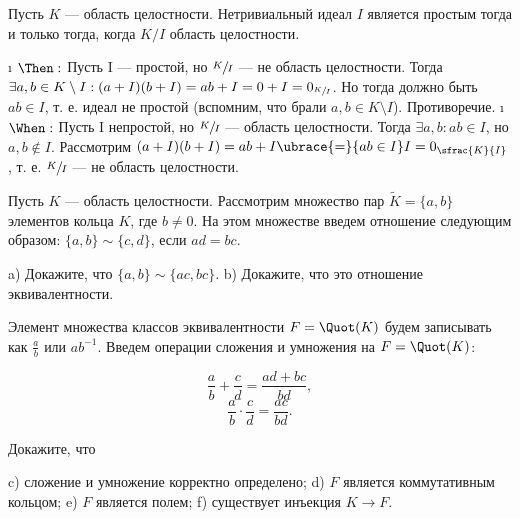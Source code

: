 \begin{problem}[22(4.7)]
Пусть $K$ --- область целостности. Нетривиальный идеал $I$ является простым тогда и только тогда, когда $K/I$ область целостности.
\end{problem}

\begin{solution}

\begin{itemize}
\tightlist
\i
  \(\Then:\)
  Пусть I --- простой, но \(\sfrac{K}{I}\) --- не область целостности. Тогда \(\exists a, b \in K\setminus I: (a+I)(b+I) = ab+I = 0+I = 0_{\sfrac{K}{I}}\). Но тогда должно быть \(ab \in I\), т. е. идеал не простой (вспомним, что брали $a, b \in K\setminus I$). Противоречие.
\i
  \(\When:\)
  Пусть I непростой, но $\sfrac{K}{I}$ --- область целостности. Тогда \(\exists a, b: ab \in I\), но \(a, b \not\in I\). Рассмотрим \((a+I)(b+I) = ab + I \ubrace{=}{ab \in I} I = 0_{\sfrac{K}{I}}\), т. е. $\sfrac{K}{I}$ --- не область целостности.
\end{itemize}

\end{solution}

\begin{problem}[23(5.1, 5.2)]
Пусть $K$ --- область целостности. Рассмотрим  множество пар $\tilde{K}=\{a,b\}$ элементов кольца $K$, где $b\neq 0$. На этом множестве введем отношение следующим образом: $\{a,b\} \sim \{c,d\}$, если $ad=bc$.

a) Докажите, что $\{a,b\} \sim \{ac,bc\}$. 
b) Докажите, что это отношение эквивалентности.

Элемент множества классов эквивалентности $F = \Quot(K)$ будем записывать как $\frac{a}{b}$ или $ab^{-1}$. Введем операции сложения и умножения на $F = \Quot(K)$:

$$\frac{a}{b} + \frac{c}{d} = \frac{ad+bc}{bd},$$
$$\frac{a}{b} \cdot \frac{c}{d} = \frac{ac}{bd}.$$

Докажите, что

c) сложение и умножение корректно определено;
d) $F$ является коммутативным кольцом;
e) $F$ является полем;
f) существует инъекция $K \to F$.

\end{problem}

